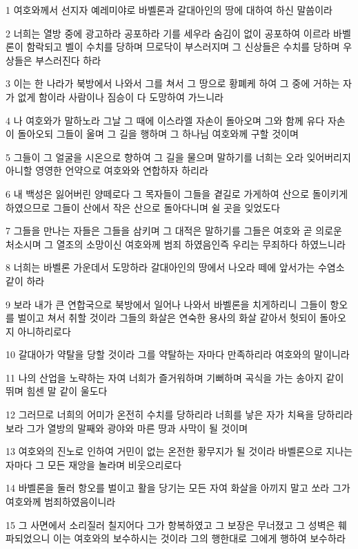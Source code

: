 \par 1 여호와께서 선지자 예레미야로 바벨론과 갈대아인의 땅에 대하여 하신 말씀이라
\par 2 너희는 열방 중에 광고하라 공포하라 기를 세우라 숨김이 없이 공포하여 이르라 바벨론이 함락되고 벨이 수치를 당하며 므로닥이 부스러지며 그 신상들은 수치를 당하며 우상들은 부스러진다 하라
\par 3 이는 한 나라가 북방에서 나와서 그를 쳐서 그 땅으로 황폐케 하여 그 중에 거하는 자가 없게 함이라 사람이나 짐승이 다 도망하여 가느니라
\par 4 나 여호와가 말하노라 그날 그 때에 이스라엘 자손이 돌아오며 그와 함께 유다 자손이 돌아오되 그들이 울며 그 길을 행하며 그 하나님 여호와께 구할 것이며
\par 5 그들이 그 얼굴을 시온으로 향하여 그 길을 물으며 말하기를 너희는 오라 잊어버리지 아니할 영영한 언약으로 여호와와 연합하자 하리라
\par 6 내 백성은 잃어버린 양떼로다 그 목자들이 그들을 곁길로 가게하여 산으로 돌이키게 하였으므로 그들이 산에서 작은 산으로 돌아다니며 쉴 곳을 잊었도다
\par 7 그들을 만나는 자들은 그들을 삼키며 그 대적은 말하기를 그들은 여호와 곧 의로운 처소시며 그 열조의 소망이신 여호와께 범죄 하였음인즉 우리는 무죄하다 하였느니라
\par 8 너희는 바벨론 가운데서 도망하라 갈대아인의 땅에서 나오라 떼에 앞서가는 수염소 같이 하라
\par 9 보라 내가 큰 연합국으로 북방에서 일어나 나와서 바벨론을 치게하리니 그들이 항오를 벌이고 쳐서 취할 것이라 그들의 화살은 연숙한 용사의 화살 같아서 헛되이 돌아오지 아니하리로다
\par 10 갈대아가 약탈을 당할 것이라 그를 약탈하는 자마다 만족하리라 여호와의 말이니라
\par 11 나의 산업을 노략하는 자여 너희가 즐거워하며 기뻐하며 곡식을 가는 송아지 같이 뛰며 힘센 말 같이 울도다
\par 12 그러므로 너희의 어미가 온전히 수치를 당하리라 너희를 낳은 자가 치욕을 당하리라 보라 그가 열방의 말째와 광야와 마른 땅과 사막이 될 것이며
\par 13 여호와의 진노로 인하여 거민이 없는 온전한 황무지가 될 것이라 바벨론으로 지나는 자마다 그 모든 재앙을 놀라며 비웃으리로다
\par 14 바벨론을 둘러 항오를 벌이고 활을 당기는 모든 자여 화살을 아끼지 말고 쏘라 그가 여호와께 범죄하였음이니라
\par 15 그 사면에서 소리질러 칠지어다 그가 항복하였고 그 보장은 무너졌고 그 성벽은 훼파되었으니 이는 여호와의 보수하시는 것이라 그의 행한대로 그에게 행하여 보수하라
